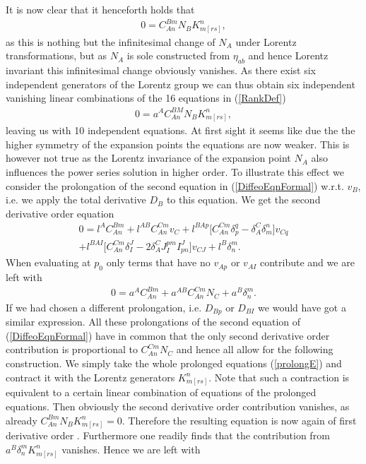 \documentclass[a4paper,12pt, DIV=14, BCOR=5mm, twoside, headsepline]{scrbook}
\begin{document}
It is now clear that it henceforth holds that
\begin{align}
    0 = C^{Bm}_{An}N_B K_{m[rs]}^n,
\end{align}
as this is nothing but the infinitesimal change of $N_A$ under Lorentz transformations, but as $N_A$ is sole constructed from $\eta_{ab}$ and hence Lorentz invariant this infinitesimal change obviously vanishes. As there exist six independent generators of the Lorentz group we can thus obtain six independent vanishing linear combinations of the 16 equations in (\ref{RankDef})
\begin{align}
    0 = a^A C^{BM}_{An}N_B K_{m[rs]}^n,
\end{align}
leaving us with 10 independent equations. At first sight it seems like due the the higher symmetry of the expansion points the equations are now weaker. This is however not true as the Lorentz invariance of the expansion point $N_A$ also influences the power series solution in higher order. To illustrate this effect we consider the prolongation of the second equation in (\ref{DiffeoEqnFormal}) w.r.t. $v_B$, i.e. we apply the total derivative $D_B$ to this equation. We get the second derivative order equation
\begin{multline}
    0 = l^AC_{An}^{Bm} + l^{AB}C_{An}^{Cm}v_C + l^{BAp} \bigl[ C_{An}^{Cm} \delta_p^q - \delta_A^C \delta_m^n \bigr] v_{Cq}\\
    + l^{BAI} \bigl[ C_{An}^{Cm} \delta_I^J - 2 \delta_A^C J_I^{pm} I^J_{pn}  \bigr] v_{CJ} + l^{B} \delta^m_n.
\end{multline}
When evaluating at $p_0$ only terms that have no $v_{Ap}$ or $v_{AI}$ contribute and we are left with 
\begin{align}\label{prolongE}
    0 = a^A C_{An}^{Bm} + a^{AB} C_{An}^{Cm} N_C +  a^B \delta^m_n.
\end{align}
If we had chosen a different prolongation, i.e. $D_{Bp}$ or $D_{BI}$ we would have got a similar expression. All these prolongations of the second equation of (\ref{DiffeoEqnFormal}) have in common that the only second derivative order contribution is proportional to $C^{Cm}_{An} N_C$ and hence all allow for the following construction. We simply take the whole prolonged equations (\ref{prolongE}) and contract it with the Lorentz generators $K_{m[rs]}^n$. Note that such a contraction is equivalent to a certain linear combination of equations of the prolonged equations. Then obviously the second derivative order contribution vanishes, as already $C_{An}^{Bm} N_B K_{m[rs]}^n = 0$.  Therefore the resulting equation is now again of first derivative order . Furthermore one readily finds that the contribution from $a^B \delta^m_n K_{m[rs]}^n$ vanishes. Hence we are left with 
\end{document}
